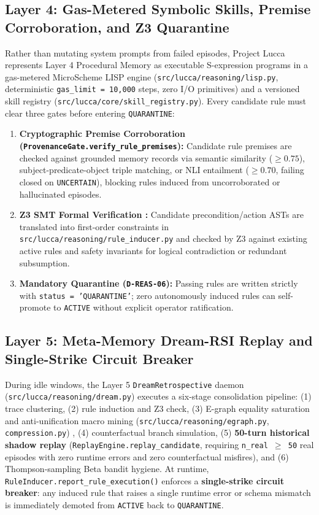\documentclass[11pt,a4paper]{article}
\begin{document}
\subsection{Layer 4: Gas-Metered Symbolic Skills, Premise Corroboration, and Z3 Quarantine}
Rather than mutating system prompts from failed episodes, Project Lucca represents Layer 4 Procedural Memory as executable S-expression programs in a gas-metered MicroScheme LISP engine (\texttt{src/lucca/reasoning/lisp.py}, deterministic \texttt{gas\_limit = 10,000} steps, zero I/O primitives) and a versioned skill registry (\texttt{src/lucca/core/skill\_registry.py}). Every candidate rule must clear three gates before entering \texttt{QUARANTINE}:
\begin{enumerate}
    \item \textbf{Cryptographic Premise Corroboration (\texttt{ProvenanceGate.verify\_rule\_premises}):} Candidate rule premises are checked against grounded memory records via semantic similarity ($\ge 0.75$), subject-predicate-object triple matching, or NLI entailment ($\ge 0.70$, failing closed on \texttt{UNCERTAIN}), blocking rules induced from uncorroborated or hallucinated episodes.
    \item \textbf{Z3 SMT Formal Verification \cite{demoura2008}:} Candidate precondition/action ASTs are translated into first-order constraints in \texttt{src/lucca/reasoning/rule\_inducer.py} and checked by Z3 against existing active rules and safety invariants for logical contradiction or redundant subsumption.
    \item \textbf{Mandatory Quarantine (\texttt{D-REAS-06}):} Passing rules are written strictly with \texttt{status = 'QUARANTINE'}; zero autonomously induced rules can self-promote to \texttt{ACTIVE} without explicit operator ratification.
\end{enumerate}

\subsection{Layer 5: Meta-Memory Dream-RSI Replay and Single-Strike Circuit Breaker}
During idle windows, the Layer 5 \texttt{DreamRetrospective} daemon (\texttt{src/lucca/reasoning/dream.py}) executes a six-stage consolidation pipeline: (1) trace clustering, (2) rule induction and Z3 check, (3) E-graph equality saturation and anti-unification macro mining (\texttt{src/lucca/reasoning/egraph.py}, \texttt{compression.py}) \cite{ellis2021, willsey2021}, (4) counterfactual branch simulation, (5) \textbf{50-turn historical shadow replay} (\texttt{ReplayEngine.replay\_candidate}, requiring \texttt{n\_real $\ge$ 50} real episodes with zero runtime errors and zero counterfactual misfires), and (6) Thompson-sampling Beta bandit hygiene. At runtime, \texttt{RuleInducer.report\_rule\_execution()} enforces a \textbf{single-strike circuit breaker}: any induced rule that raises a single runtime error or schema mismatch is immediately demoted from \texttt{ACTIVE} back to \texttt{QUARANTINE}.
\end{document}

